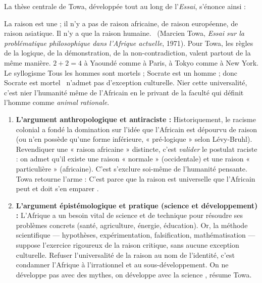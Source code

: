 \documentclass[11pt]{article}
\begin{document}
La thèse centrale de Towa, développée tout au long de l'\emph{Essai}, s'énonce ainsi :

\begin{propriete}
\guillemotleft La raison est une ; il n'y a pas de raison africaine, de raison européenne, de raison asiatique. Il n'y a que la raison humaine. \guillemotright\ (Marcien Towa, \emph{Essai sur la problématique philosophique dans l'Afrique actuelle}, 1971). Pour Towa, les règles de la logique, de la démonstration, de la non-contradiction, valent partout de la même manière. $2+2=4$ à Yaoundé comme à Paris, à Tokyo comme à New York. Le syllogisme \guillemotleft Tous les hommes sont mortels ; Socrate est un homme ; donc Socrate est mortel \guillemotright\ n'admet pas d'exception culturelle. Nier cette universalité, c'est nier l'humanité même de l'Africain en le privant de la faculté qui définit l'homme comme \emph{animal rationale}.
\end{propriete}

\begin{aretenir}
\begin{enumerate}
\item \textbf{L'argument anthropologique et antiraciste :} Historiquement, le racisme colonial a fondé la domination sur l'idée que l'Africain est dépourvu de raison (ou n'en possède qu'une forme inférieure, « pré-logique » selon Lévy-Bruhl). Revendiquer une « raison africaine » distincte, c'est \emph{valider} le postulat raciste : on admet qu'il existe une raison « normale » (occidentale) et une raison « particulière » (africaine). C'est s'exclure soi-même de l'humanité pensante. Towa retourne l'arme : \guillemotleft C'est parce que la raison est universelle que l'Africain peut et doit s'en emparer \guillemotright.
\item \textbf{L'argument épistémologique et pratique (science et développement) :} L'Afrique a un besoin vital de science et de technique pour résoudre ses problèmes concrets (santé, agriculture, énergie, éducation). Or, la méthode scientifique — hypothèses, expérimentation, falsification, mathématisation — suppose l'exercice rigoureux de la raison critique, sans aucune exception culturelle. Refuser l'universalité de la raison au nom de l'identité, c'est condamner l'Afrique à l'irrationnel et au sous-développement. \guillemotleft On ne développe pas avec des mythes, on développe avec la science \guillemotright, résume Towa.
\end{enumerate}
\end{aretenir}
\end{document}

